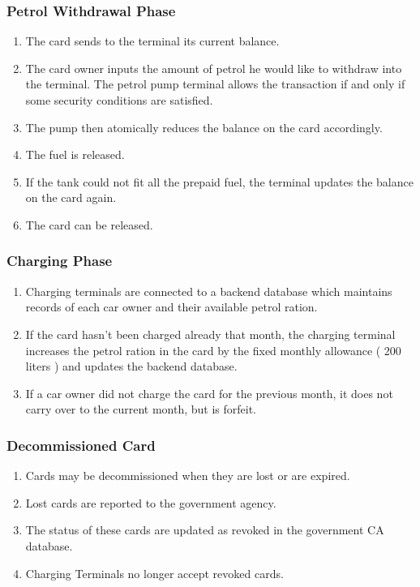 \subsubsection{Petrol Withdrawal Phase}

\begin{enumerate}
  \item The card sends to the terminal its current balance.
  \item The card owner inputs the amount of petrol he would like to withdraw into the terminal. The petrol pump terminal allows the transaction if and only if some security conditions are satisfied.
  \item The pump then atomically reduces the balance on the card accordingly.
  \item The fuel is released.
  \item If the tank could not fit all the prepaid fuel, the terminal updates the balance on the card again.
  \item The card can be released.
\end{enumerate}


\subsubsection{Charging Phase}

\begin{enumerate}
  \item Charging terminals are connected to a backend database which maintains records of each car owner and their available petrol ration.
  \item If the card hasn't been charged already that month, the charging terminal increases the petrol ration in the card by the fixed monthly allowance ( 200 liters ) and updates the backend database. 
  \item If a car owner did not charge the card for the previous month, it does not carry over to the current month, but is forfeit.
\end{enumerate}


\subsubsection{Decommissioned Card}

\begin{enumerate}
  \item Cards may be decommissioned when they are lost or are expired.
  \item Lost cards are reported to the government agency.
  \item The status of these cards are updated as revoked in the government CA database.
  \item Charging Terminals no longer accept revoked cards.
\end{enumerate}
